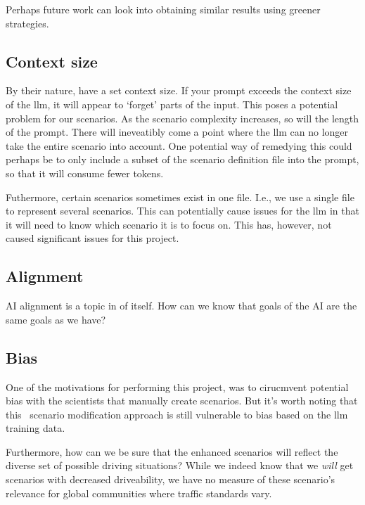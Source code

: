 Perhaps future work can look into obtaining similar results using greener strategies.


\subsection{Context size}

By their nature,  have a set context size. If your prompt exceeds the context size
of the \acrshort{llm}, it will appear to `forget' parts of the input. This poses a potential problem
for our scenarios. As the scenario complexity increases, so will the length of the prompt. There
will ineveatibly come a point where the \acrshort{llm} can no longer take the entire scenario into
account. One potential way of remedying this could perhaps be to only include a subset of the
scenario definition file into the prompt, so that it will consume fewer tokens.

Futhermore, certain scenarios sometimes exist in one file. I.e., we use a single file to represent
several scenarios. This can potentially cause issues for the \acrshort{llm} in that it will need to
know which scenario it is to focus on. This has, however, not caused significant issues for this project.

\subsection{Alignment}

AI alignment is a topic in of itself. How can we know that goals of the AI are the same goals as we
have?

\subsection{Bias}

One of the motivations for performing this project, was to cirucmvent potential bias with the
scientists that manually create scenarios. But it's worth noting that this \hefe~scenario
modification approach is still vulnerable to bias based on the \acrshort{llm} training data.

Furthermore, how can we be sure that the enhanced scenarios will reflect the diverse set of possible
driving situations? While we indeed know that we \emph{will} get scenarios with decreased
driveability, we have no measure of these scenario's relevance for global communities where traffic
standards vary.

